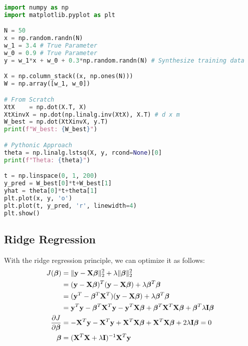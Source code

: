 \begin{lstlisting}[language=Python]
import numpy as np
import matplotlib.pyplot as plt

N = 50
x = np.random.randn(N)
w_1 = 3.4 # True Parameter
w_0 = 0.9 # True Parameter
y = w_1*x + w_0 + 0.3*np.random.randn(N) # Synthesize training data

X = np.column_stack((x, np.ones(N)))
W = np.array([w_1, w_0])

# From Scratch
XtX    = np.dot(X.T, X)
XtXinvX = np.dot(np.linalg.inv(XtX), X.T) # d x m
W_best = np.dot(XtXinvX, y.T)
print(f"W_best: {W_best}") 

# Pythonic Approach
theta = np.linalg.lstsq(X, y, rcond=None)[0]
print(f"Theta: {theta}") 

t = np.linspace(0, 1, 200)
y_pred = W_best[0]*t+W_best[1]
yhat = theta[0]*t+theta[1]
plt.plot(x, y, 'o')
plt.plot(t, y_pred, 'r', linewidth=4)
plt.show()
\end{lstlisting}

\subsection{Ridge Regression}
With the ridge regression principle, we can optimize it as follows:
\begin{align}
	J(\boldsymbol{\beta}) &= \|\mathbf{y}-\mathbf{X}\boldsymbol{\beta}\|^2_2 + \lambda \|\boldsymbol{\beta}\|^2_2 \\
			&= (\mathbf{y}-\mathbf{X}\boldsymbol{\beta})^T(\mathbf{y}-\mathbf{X}\boldsymbol{\beta})+\lambda\boldsymbol{\beta}^T\boldsymbol{\beta}\\
			&= (\mathbf{y}^T-\boldsymbol{\beta}^T\mathbf{X}^T)(\mathbf{y}-\mathbf{X}\boldsymbol{\beta})+\lambda\boldsymbol{\beta}^T\boldsymbol{\beta}\\
			&= {\mathbf{y}}^T{\mathbf{y}}-\boldsymbol{\beta}^T\mathbf{X}^T{\mathbf{y}}-{\mathbf{y}}^T\mathbf{X}\boldsymbol{\beta}+\boldsymbol{\beta}^T\mathbf{X}^T\mathbf{X}\boldsymbol{\beta}+\boldsymbol{\beta}^T\lambda\mathbf{I}\boldsymbol{\beta}\\
	\frac{\partial J}{\partial \boldsymbol{\beta}}&= -\mathbf{X}^T{\mathbf{y}}-\mathbf{X}^T{\mathbf{y}}+\mathbf{X}^T\mathbf{X}\boldsymbol{\beta}+\mathbf{X}^T\mathbf{X}\boldsymbol{\beta}+2\lambda\mathbf{I}\boldsymbol{\beta} = 0\\
	\boldsymbol{\beta}	&= (\mathbf{X}^T\mathbf{X}+\lambda\mathbf{I})^{-1}\mathbf{X}^T{\mathbf{y}}
	\label{eq:ridge_regression}
\end{align}

